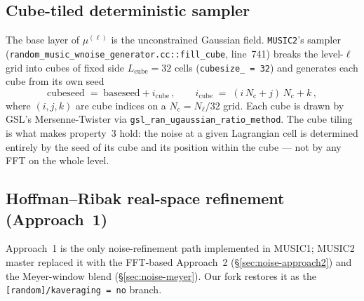 \documentclass[12pt]{article}
\newcommand{\code}[1]{\texttt{#1}}
\begin{document}
\subsection{Cube-tiled deterministic sampler}
\label{sec:noise-cubetile}

The base layer of $\mu^{(\ell)}$ is the unconstrained Gaussian field.
\texttt{MUSIC2}'s sampler (\code{random\_music\_wnoise\_generator.cc::fill\_cube},
line~741) breaks the level-$\ell$ grid into cubes of fixed side
$L_\mathrm{cube} = 32$ cells (\code{cubesize\_ = 32}) and generates
each cube from its own seed
\begin{equation}
  \mathrm{cubeseed} \;=\; \mathrm{baseseed} + i_\mathrm{cube}\,,
  \qquad
  i_\mathrm{cube} \;=\; (i\,N_\mathrm{c} + j)\,N_\mathrm{c} + k\,,
  \label{eq:cubeseed}
\end{equation}
where $(i, j, k)$ are cube indices on a
$N_\mathrm{c} = N_\ell / 32$ grid.  Each cube is drawn by GSL's
Mersenne-Twister via \code{gsl\_ran\_ugaussian\_ratio\_method}.
The cube tiling is what makes property~3 hold: the noise at a given
Lagrangian cell is determined entirely by the seed of its cube and
its position within the cube --- not by any FFT on the whole level.

\subsection{Hoffman--Ribak real-space refinement (Approach~1)}
\label{sec:noise-approach1}

Approach~1 is the only noise-refinement path implemented in MUSIC1;
MUSIC2 master replaced it with the FFT-based Approach~2
(\S\ref{sec:noise-approach2}) and the Meyer-window blend
(\S\ref{sec:noise-meyer}).  Our fork restores it as the
\code{[random]/kaveraging = no} branch.
\end{document}
